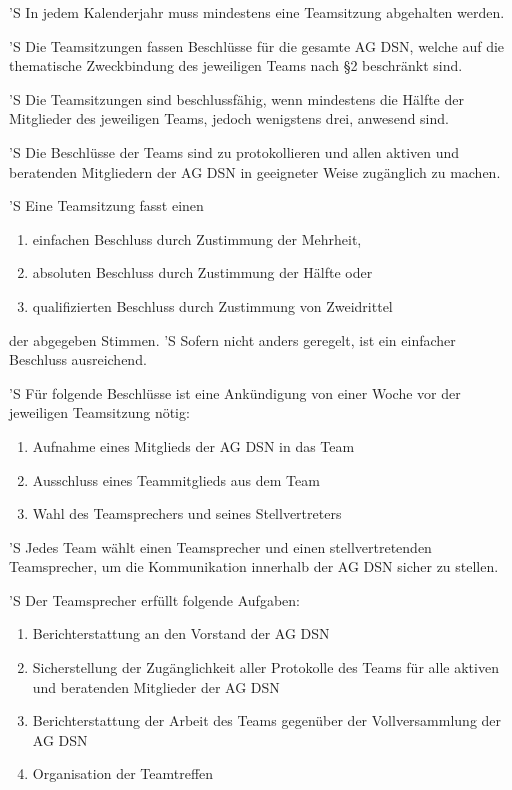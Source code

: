 \documentclass[draft,parskip=half-,DIV=12,mpinclude]{scrartcl}
\begin{document}
\begin{contract}
'S In jedem Kalenderjahr muss mindestens eine Teamsitzung abgehalten werden.

'S Die Teamsitzungen fassen Beschlüsse für die gesamte AG DSN, welche auf die thematische Zweckbindung des jeweiligen Teams nach §2 beschränkt sind.

'S Die Teamsitzungen sind beschlussfähig, wenn mindestens die Hälfte der Mitglieder des jeweiligen Teams, jedoch wenigstens drei, anwesend sind.

'S Die Beschlüsse der Teams sind zu protokollieren und allen aktiven und beratenden Mitgliedern der AG DSN in geeigneter Weise zugänglich zu machen.

'S Eine Teamsitzung fasst einen
\begin{enumerate}
  \item einfachen Beschluss durch Zustimmung der Mehrheit,
  \item absoluten Beschluss durch Zustimmung der Hälfte oder
  \item qualifizierten Beschluss durch Zustimmung von Zweidrittel
\end{enumerate}
der abgegeben Stimmen.
'S Sofern nicht anders geregelt, ist ein einfacher Beschluss ausreichend.

'S Für folgende Beschlüsse ist eine Ankündigung von einer Woche vor der jeweiligen Teamsitzung nötig:
\begin{enumerate}
  \item Aufnahme eines Mitglieds der AG DSN in das Team
  \item Ausschluss eines Teammitglieds aus dem Team
  \item Wahl des Teamsprechers und seines Stellvertreters
\end{enumerate}


'S Jedes Team wählt einen Teamsprecher und einen stellvertretenden Teamsprecher, um die Kommunikation innerhalb der AG DSN sicher zu stellen.

'S Der Teamsprecher erfüllt folgende Aufgaben:
\begin{enumerate}
  \item Berichterstattung an den Vorstand der AG DSN
  \item Sicherstellung der Zugänglichkeit aller Protokolle des Teams für alle aktiven und beratenden Mitglieder der AG DSN
  \item Berichterstattung der Arbeit des Teams gegenüber der Vollversammlung der AG DSN
  \item Organisation der Teamtreffen
\end{enumerate}


\end{contract}
\end{document}
